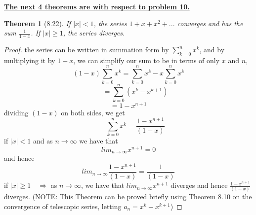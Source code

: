 \documentclass[aps,pra,notitlepage,amsmath,amssymb,letterpaper,12pt]{revtex4-1}
\newtheorem{theorem}{Theorem}
\begin{document}
\underline{\textbf{The next 4 theorems are with respect to problem 10.}}
\begin{theorem}[8.22]
If $|x| < 1$, the series $1 + x + x^2 + ... $  converges and has the sum $\frac{1}{1-x}$. If $|x| \geq 1$, the series diverges.
\end{theorem}
\begin{proof}
the series can be written in summation form by $\sum_{k=0}^{n}x^k$, and by multiplying it by $1-x$, we can simplify our sum to be in terms of only $x$ and $n$,
    $$(1-x)\sum_{k=0}^{n}x^k = \sum_{k=0}^{n}x^k - x\sum_{k=0}^{n}x^k$$
    $$\qquad = \sum_{k=0}^{n}(x^k - x^{k+1})$$
    $$ = 1-x^{n+1}$$
    dividing $(1-x)$ on both sides, we get
    $$\qquad \sum_{k=0}^{n}x^k = \frac{1-x^{n+1}}{(1-x)}$$
if $ \left| x \right| < 1$ and as $n \rightarrow \infty$ we have that
$$lim_{n \rightarrow \infty}x^{n+1} = 0$$
and hence
$$lim_{n \rightarrow \infty}\frac{1-x^{n+1}}{(1-x)}=\frac{1}{(1-x)}$$
if $ \left| x \right| \geq 1 \quad \Rightarrow$ as $n \rightarrow \infty$, we have that
$lim_{n \rightarrow \infty}x^{n+1}$ diverges and hence $\frac{1-x^{n+1}}{(1-x)}$ diverges.
\newline{}
(NOTE: This Theorem can be proved briefly using Theorem 8.10 on the convergence of telescopic series, letting $a_{n} = x^{k} - x^{k+1}$)
\end{proof}
\end{document}

